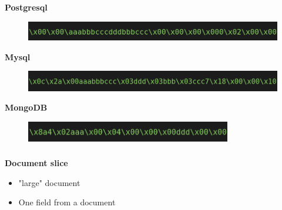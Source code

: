 \documentclass[usenames,dvipsnames, 18pt, compress, aspectratio=169]{beamer}
\begin{document}
\begin{frame}
    \frametitle{}
    \begin{center}

    \textbf{Postgresql}
    \begin{figure}
        \includegraphics[width=1.0\textwidth,left]{postgresql_update_journal.png}\\
    \end{figure}

    \textbf{Mysql}
    \begin{figure}
        \includegraphics[width=1.0\textwidth,left]{mysql_update_journal.png}\\
    \end{figure}

    \textbf{MongoDB}
    \begin{figure}
        \includegraphics[width=0.8\textwidth,left]{mongodb_update_journal.png}
    \end{figure}

    \end{center}
\end{frame}

\begin{frame}
    \frametitle{}
    \begin{center}
        \textbf{Document slice}
        \begin{itemize}[label={}]
            \item "large" document
            \item One field from a document
        \end{itemize}
    \end{center}
\end{frame}

\fontsize{17pt}{19}\selectfont
\begin{frame}
    \frametitle{}
    \begin{center}

    \end{center}
\end{frame}
\end{document}
